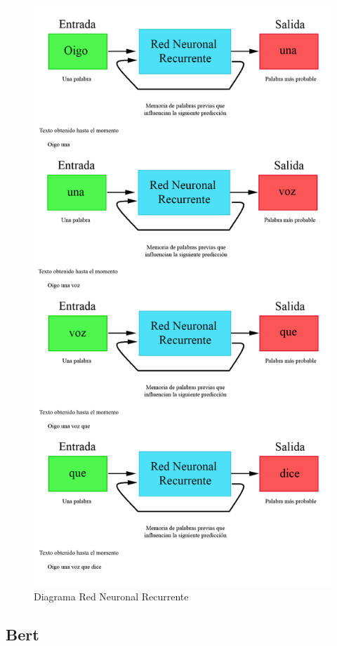 \documentclass[12pt, a4paper, titlepage]{report}
\begin{document}
				\begin{figure}[H] \caption{Diagrama Red Neuronal Recurrente}
					\includegraphics[width=12cm]{./imagenes/MarcoTeorico/RedesN/Recurrente.png}
					\centering 
				\end{figure}				
				\subsection{Bert}
\end{document}
